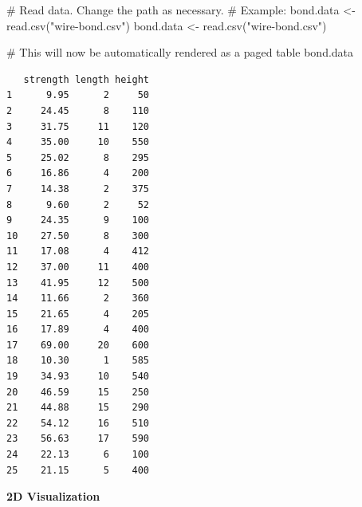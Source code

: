 \documentclass[
  letterpaper,
]{scrbook}
\newenvironment{Shaded}{\begin{snugshade}}{\end{snugshade}}
\newcommand{\CommentTok}[1]{\textcolor[rgb]{0.37,0.37,0.37}{#1}}
\newcommand{\FunctionTok}[1]{\textcolor[rgb]{0.28,0.35,0.67}{#1}}
\newcommand{\NormalTok}[1]{\textcolor[rgb]{0.00,0.23,0.31}{#1}}
\newcommand{\OtherTok}[1]{\textcolor[rgb]{0.00,0.23,0.31}{#1}}
\newcommand{\StringTok}[1]{\textcolor[rgb]{0.13,0.47,0.30}{#1}}
\begin{document}
\begin{Shaded}
\begin{Highlighting}[]
\CommentTok{\# Read data. Change the path as necessary.}
\CommentTok{\# Example: bond.data \textless{}{-} read.csv("wire{-}bond.csv")}
\NormalTok{bond.data }\OtherTok{\textless{}{-}} \FunctionTok{read.csv}\NormalTok{(}\StringTok{"wire{-}bond.csv"}\NormalTok{)}

\CommentTok{\# This will now be automatically rendered as a paged table}
\NormalTok{bond.data}
\end{Highlighting}
\end{Shaded}

\begin{verbatim}
   strength length height
1      9.95      2     50
2     24.45      8    110
3     31.75     11    120
4     35.00     10    550
5     25.02      8    295
6     16.86      4    200
7     14.38      2    375
8      9.60      2     52
9     24.35      9    100
10    27.50      8    300
11    17.08      4    412
12    37.00     11    400
13    41.95     12    500
14    11.66      2    360
15    21.65      4    205
16    17.89      4    400
17    69.00     20    600
18    10.30      1    585
19    34.93     10    540
20    46.59     15    250
21    44.88     15    290
22    54.12     16    510
23    56.63     17    590
24    22.13      6    100
25    21.15      5    400
\end{verbatim}

\textbf{2D Visualization}
\end{document}
